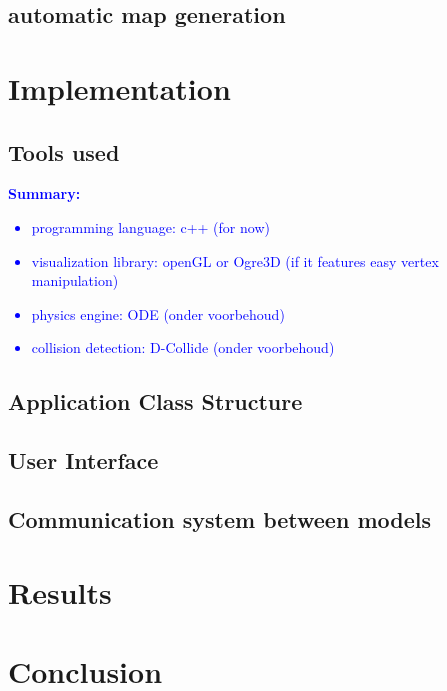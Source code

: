 \documentclass{article}
\newcommand{\inhoud}[1]{\textcolor{blue}{\textbf{Summary: }\it{#1}}}
\begin{document}
\subsection{automatic map generation} 


\section{Implementation}
\subsection{Tools used}
\inhoud{ 
\begin{itemize}
\item programming language: c++ (for now)
\item visualization library: openGL or Ogre3D (if it features easy vertex manipulation) 
\item physics engine: ODE (onder voorbehoud)  
\item collision detection: D-Collide (onder voorbehoud)
\end{itemize}
}

\subsection{Application Class Structure}
\subsection{User Interface}
\subsection{Communication system between models}

\section{Results}

\section{Conclusion}





\newpage 
\end{document}

